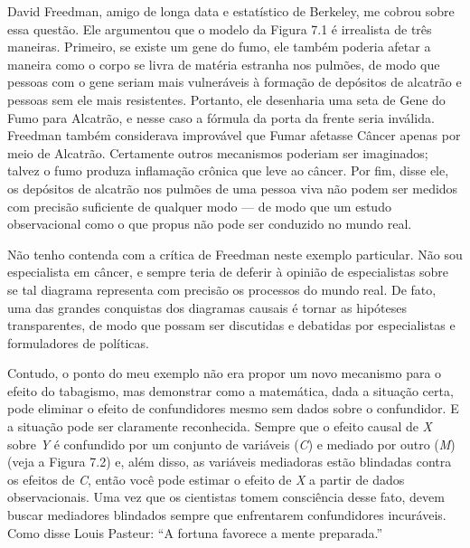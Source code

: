 \documentclass[11pt,a5paper,twoside]{book}
\begin{document}
David Freedman, amigo de longa data e estatístico de Berkeley, me cobrou sobre essa questão. Ele argumentou que o modelo da Figura 7.1 é irrealista de três maneiras. Primeiro, se existe um gene do fumo, ele também poderia afetar a maneira como o corpo se livra de matéria estranha nos pulmões, de modo que pessoas com o gene seriam mais vulneráveis à formação de depósitos de alcatrão e pessoas sem ele mais resistentes. Portanto, ele desenharia uma seta de Gene do Fumo para Alcatrão, e nesse caso a fórmula da porta da frente seria inválida. Freedman também considerava improvável que Fumar afetasse Câncer apenas por meio de Alcatrão. Certamente outros mecanismos poderiam ser imaginados; talvez o fumo produza inflamação crônica que leve ao câncer. Por fim, disse ele, os depósitos de alcatrão nos pulmões de uma pessoa viva não podem ser medidos com precisão suficiente de qualquer modo — de modo que um estudo observacional como o que propus não pode ser conduzido no mundo real.

Não tenho contenda com a crítica de Freedman neste exemplo particular. Não sou especialista em câncer, e sempre teria de deferir à opinião de especialistas sobre se tal diagrama representa com precisão os processos do mundo real. De fato, uma das grandes conquistas dos diagramas causais é tornar as hipóteses transparentes, de modo que possam ser discutidas e debatidas por especialistas e formuladores de políticas.

Contudo, o ponto do meu exemplo não era propor um novo mecanismo para o efeito do tabagismo, mas demonstrar como a matemática, dada a situação certa, pode eliminar o efeito de confundidores mesmo sem dados sobre o confundidor. E a situação pode ser claramente reconhecida. Sempre que o efeito causal de \textit{X} sobre \textit{Y} é confundido por um conjunto de variáveis (\textit{C}) e mediado por outro (\textit{M}) (veja a Figura 7.2) e, além disso, as variáveis mediadoras estão blindadas contra os efeitos de \textit{C}, então você pode estimar o efeito de \textit{X} a partir de dados observacionais. Uma vez que os cientistas tomem consciência desse fato, devem buscar mediadores blindados sempre que enfrentarem confundidores incuráveis. Como disse Louis Pasteur: “A fortuna favorece a mente preparada.”
\end{document}
